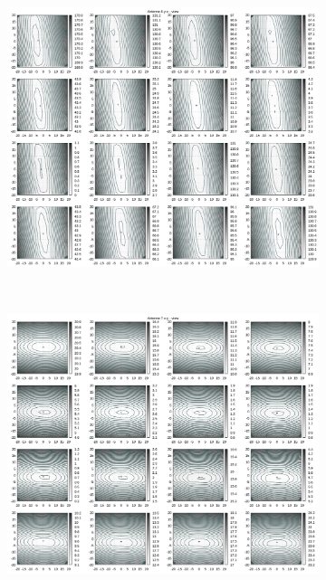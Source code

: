 \begin{appendix}
\begin{figure}[!ht]
\begin{subfigure}[t]{0.3\textwidth}
	\end{subfigure}
	\begin{subfigure}[t]{0.3\textwidth}
			\centering
	   \includegraphics[width=\textwidth]{img/fitness/yz/a6.png}
	\end{subfigure}
\\
	\centering
	\begin{subfigure}[t]{0.3\textwidth}
	     \centering
	     \includegraphics[width=\textwidth]{img/fitness/xy/a7.png}

\end{subfigure}
\end{figure}
\end{appendix}
